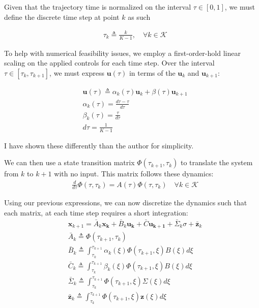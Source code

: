 \documentclass[conf]{new-aiaa}
\begin{document}
\begin{singlespace}
Given that the trajectory time is normalized on the interval $\tau \in [0,1 ]$, we must define the discrete time step at point $k$ as such

\begin{align}
& \tau_k \triangleq \frac{k}{K-1}, \quad \forall k \in \mathcal{K}
\end{align}

To help with numerical feasibility issues, we employ a first-order-hold linear scaling on the applied controls for each time step. Over the interval $\tau \in [\tau_k, \tau_{k+1}]$, we must express $\mathbf{u}(\tau)$ in terms of the $\mathbf{u}_k$
 and $\mathbf{u}_{k+1}$:

 \begin{align}
& \mathbf{u}(\tau) \triangleq \alpha_k(\tau) \mathbf{u}_k + \beta(\tau) \mathbf{u}_{k+1} \\ 
& \alpha_k(\tau) = \frac{d\tau - \tau}{d\tau} \\
& \beta_k(\tau) = \frac{\tau}{d\tau} \\
& d\tau = \frac{1}{K-1}
\end{align}

I have shown these differently than the author for simplicity.

We can then use a state transition matrix $\Phi(\tau_{k+1},\tau_k)$ to translate the system from $k$ to $k+1$ with no input. This matrix follows these dynamics:
\begin{align}
& \frac{d}{d\tau} \Phi(\tau,\tau_k) = A(\tau) \Phi(\tau,\tau_k) \quad \forall k \in \mathcal{K}
\end{align}

Using our previous expressions, we can now discretize the dynamics such that each matrix, at each time step requires a short integration:
 \begin{align}
& \mathbf{x}_{k+1} = \bar{A}_k\mathbf{x_k} + \bar{B}_k\mathbf{u_k} + \bar{C}\mathbf{u_{k+1}} + \bar{\Sigma}_k\sigma + \bar{\mathbf{z}}_k  \\
& \bar{A}_k \triangleq  \Phi(\tau_{k+1},\tau_k)\\
& \bar{B}_k \triangleq \int_{\tau_k}^{\tau_{k+1}} \alpha_k(\xi) \Phi(\tau_{k+1},\xi) B(\xi) d\xi\\
& \bar{C}_k \triangleq \int_{\tau_k}^{\tau_{k+1}} \beta_k(\xi) \Phi(\tau_{k+1},\xi) B(\xi)  d\xi\\
& \bar{\Sigma}_k \triangleq \int_{\tau_k}^{\tau_{k+1}} \Phi(\tau_{k+1},\xi) \Sigma(\xi) d\xi\\
& \bar{\mathbf{z}}_k \triangleq \int_{\tau_k}^{\tau_{k+1}} \Phi(\tau_{k+1},\xi) \mathbf{z}(\xi) d\xi\\
\end{align}


\end{singlespace}
\end{document}
